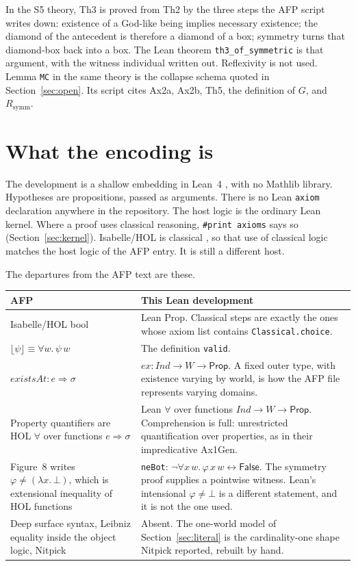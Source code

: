 \documentclass[11pt,a4paper]{article}
\newcommand{\valid}[1]{\lfloor #1 \rfloor}
\newcommand{\lean}[1]{\texttt{#1}}
\theoremstyle{definition}
\theoremstyle{remark}
\begin{document}
In the S5 theory, Th3 is proved from Th2 by the three steps the AFP script
writes down: existence of a God-like being implies necessary existence; the
diamond of the antecedent is therefore a diamond of a box; symmetry turns
that diamond-box back into a box.
The Lean theorem \lean{th3\_of\_symmetric} is that argument, with the witness
individual written out.
Reflexivity is not used.
Lemma \lean{MC} in the same theory is the collapse schema quoted in
Section~\ref{sec:open}.
Its script cites Ax2a, Ax2b, Th5, the definition of \(G\), and \(R_{\mathrm{symm}}\).

\section{What the encoding is}
\label{sec:encoding}

The development is a shallow embedding in Lean~4 \cite{demouraUllrich2021},
with no Mathlib library.
Hypotheses are propositions, passed as arguments.
There is no Lean \lean{axiom} declaration anywhere in the repository.
The host logic is the ordinary Lean kernel.
Where a proof uses classical reasoning, \lean{\#print axioms} says so
(Section~\ref{sec:kernel}).
Isabelle/HOL is classical \cite{nipkow2002}, so that use of classical logic
matches the host logic of the AFP entry.
It is still a different host.

The departures from the AFP text are these.

\begin{center}
\small
\begin{tabular}{@{}p{}p{}@{}}
\toprule
AFP & This Lean development \\
\midrule
Isabelle/HOL \textsf{bool} &
  Lean \textsf{Prop}.
  Classical steps are exactly the ones whose axiom list contains
  \lean{Classical.choice}. \\
\(\valid{\psi} \equiv \forall w.\, \psi\,w\) &
  The definition \lean{valid}. \\
\(\mathit{existsAt} : e \Rightarrow \sigma\) &
  \(\mathit{ex} : \mathit{Ind} \to W \to \mathsf{Prop}\).
  A fixed outer type, with existence varying by world, is how the AFP file
  represents varying domains. \\
Property quantifiers are HOL \(\forall\) over functions \(e \Rightarrow \sigma\) &
  Lean \(\forall\) over functions \(\mathit{Ind} \to W \to \mathsf{Prop}\).
  Comprehension is full: unrestricted quantification over properties,
  as in their impredicative Ax1Gen. \\
Figure~8 writes \(\varphi \neq (\lambda x.\, \bot)\), which is extensional
inequality of HOL functions &
  \lean{neBot}: \(\neg \forall x\,w.\, \varphi\,x\,w \leftrightarrow \mathsf{False}\).
  The symmetry proof supplies a pointwise witness.
  Lean's intensional \(\varphi \neq \bot\) is a different statement, and it is
  not the one used. \\
Deep surface syntax, Leibniz equality inside the object logic, Nitpick &
  Absent.
  The one-world model of Section~\ref{sec:literal} is the cardinality-one shape
  Nitpick reported, rebuilt by hand. \\
\bottomrule
\end{tabular}
\end{center}
\end{document}
